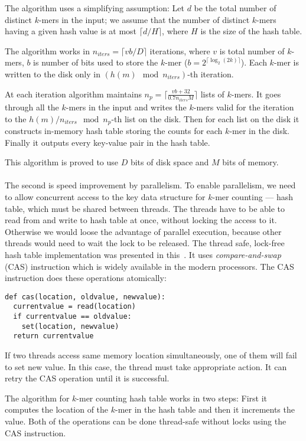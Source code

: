 The algorithm uses a simplifying assumption: Let $d$ be the total number of distinct $k$-mers in the input; we assume that the number of distinct $k$-mers having a given hash value is at most $\lceil d/H \rceil$, where $H$ is the size of the hash table\cite{dsk}.

The algorithm works in $n_{iters} = \lceil vb/D\rceil$ iterations, where $v$ is total number of $k$-mers, $b$ is number of bits used to store the $k$-mer ($b = 2^{\lceil\log_2(2k)\rceil}$). Each $k$-mer is written to the disk only in $(h(m) \mod n_{iters})$-th iteration.

At each iteration algorithm maintains $n_p = \lceil\frac{vb+32}{0.7n_{iters}M}\rceil$ lists of $k$-mers.
It goes through all the $k$-mers in the input and writes the $k$-mers valid for the iteration to the $h(m)/n_{iters} \mod n_p$-th list on the disk.
Then for each list on the disk it constructs in-memory hash table storing the counts for each $k$-mer in the disk.
Finally it outputs every key-value pair in the hash table.

This algorithm is proved to use $D$ bits of disk space and $M$ bits of memory\cite{dsk}.

\paragraph{} The second is speed improvement by parallelism. To enable parallelism, we need to allow concurrent access to the key data structure for $k$-mer counting --- hash table, which must be shared between threads. The threads have to be able to read from and write to hash table at once, without locking the access to it. Otherwise we would loose the advantage of parallel execution, because other threads would need to wait the lock to be released. The thread safe, lock-free hash table implementation was presented in this~\cite{jellyfish}. It uses \emph{compare-and-swap} (CAS) instruction which is widely available in the modern processors. The CAS instruction does these operations atomically:
\begin{lstlisting}
def cas(location, oldvalue, newvalue):
  currentvalue = read(location)
  if currentvalue == oldvalue:
    set(location, newvalue)
  return currentvalue
\end{lstlisting}
If two threads access same memory location simultaneously, one of them will fail to set new value. In this case, the thread must take appropriate action.
It can retry the CAS operation until it is successful.

The algorithm for $k$-mer counting hash table works in two steps:
First it computes the location of the $k$-mer in the hash table and then it increments the value. Both of the operations can be done thread-safe without locks using the CAS instruction.

